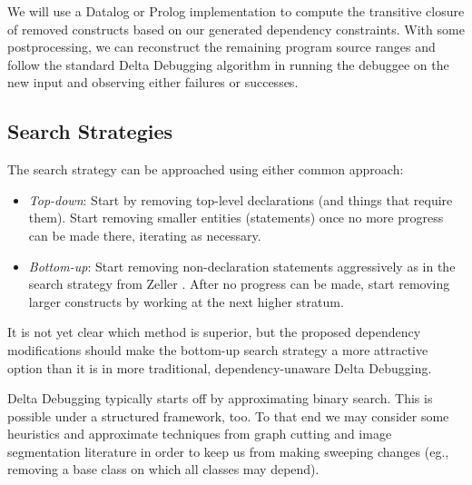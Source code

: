 \documentclass[11pt]{article}
\begin{document}
\begin{itemize}
  We will use a Datalog or Prolog implementation to compute the transitive
  closure of removed constructs based on our generated dependency constraints.
  With some postprocessing, we can reconstruct the remaining program source ranges
  and follow the standard Delta Debugging algorithm in running the debuggee on the
  new input and observing either failures or successes.

\subsection{Search Strategies}
The search strategy can be approached using either common approach:
\begin{itemize}
\item \emph{Top-down}: Start by removing top-level declarations (and things that
  require them). Start removing smaller entities (statements) once no more
  progress can be made there, iterating as necessary.
\item \emph{Bottom-up}: Start removing non-declaration statements aggressively
  as in the search strategy from Zeller \cite{dd}. After no progress can be made, start
  removing larger constructs by working at the next higher stratum.
\end{itemize}
It is not yet clear which method is superior, but the proposed dependency
modifications should make the bottom-up search strategy a more attractive
option than it is in more traditional, dependency-unaware Delta Debugging.

Delta Debugging typically starts off by approximating binary search. This is
possible under a structured framework, too. To that end we may consider some
heuristics and approximate techniques from graph cutting and image segmentation
literature \cite{nc} in order to keep us from making sweeping changes (eg.,
removing a base class on which all classes may depend).


\end{itemize}
\end{document}

